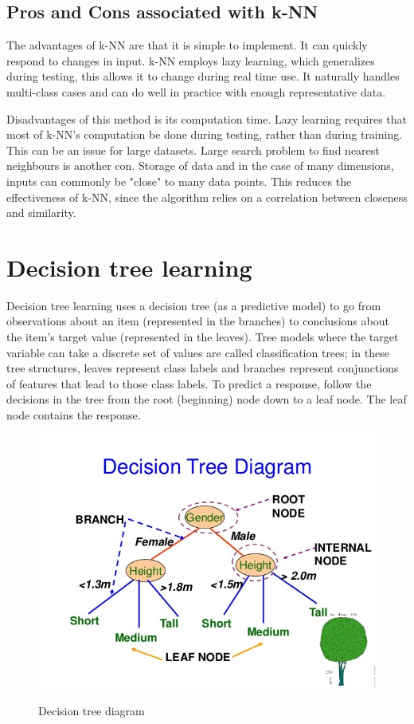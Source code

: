\subsection{Pros and Cons associated with k-NN} \label{Pros and Cons associated with k-NN}
\noindent The advantages of k-NN are that it is simple to implement. It can quickly respond to changes in input. k-NN employs lazy learning, which generalizes during testing, this allows it to change during real time use. It naturally handles multi-class cases and can do well in practice with enough representative data. 

\noindent Disadvantages of this method is its computation time. Lazy learning requires that most of k-NN's computation be done during testing, rather than during training. This can be an issue for large datasets. Large search problem to find nearest neighbours is another con. Storage of data and in the case of many dimensions, inputs can commonly be "close" to many data points. This reduces the effectiveness of k-NN, since the algorithm relies on a correlation between closeness and similarity.

\section{Decision tree learning} \label{Decision tree learning}

\noindent Decision tree learning uses a decision tree (as a predictive model) to go from observations about an item (represented in the branches) to conclusions about the item's target value (represented in the leaves). Tree models where the target variable can take a discrete set of values are called classification trees; in these tree structures, leaves represent class labels and branches represent conjunctions of features that lead to those class labels. To predict a response, follow the decisions in the tree from the root (beginning) node down to a leaf node. The leaf node contains the response.


\begin{figure}[H]
\centering
{\includegraphics[scale=0.65]{dt.jpg}}
\caption{Decision tree diagram}
\end{figure}

